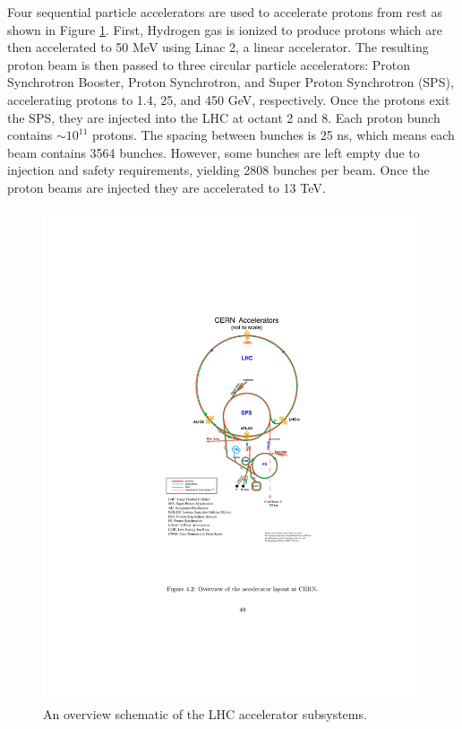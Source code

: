 Four sequential particle accelerators are used to accelerate protons from rest as shown in Figure \ref{fig:lhc_accel}. First, Hydrogen gas is ionized to produce protons which are then accelerated to 50 MeV using Linac 2, a linear accelerator. The resulting proton beam is then passed to three circular particle accelerators: Proton Synchrotron Booster, Proton Synchrotron, and Super Proton Synchrotron (SPS), accelerating protons to 1.4, 25, and 450 GeV, respectively. Once the protons exit the SPS, they are injected into the LHC at octant 2 and 8. Each proton bunch contains $\sim 10^{11}$ protons. The spacing between bunches is 25 ns, which means each beam contains 3564 bunches. However, some bunches are left empty due to injection and safety requirements, yielding 2808 bunches per beam. Once the proton beams are injected they are accelerated to 13 TeV. 


\begin{figure}[htbp]
  \centering
  \includegraphics{figures/Detector/lhc_accel.pdf}
  \caption{An overview schematic of the LHC accelerator subsystems.} 
  \label{fig:lhc_accel}
\end{figure}
\FloatBarrier


